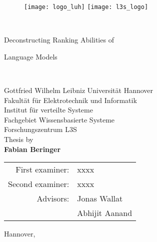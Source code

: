 \thispagestyle{empty}

{\sffamily
	\begin{figure}
		\texttt{[image: logo\_luh]}
		\hfill
		\texttt{[image: l3s\_logo]}
	\end{figure}
	\begin{center}
		\mbox{} \\
		\vspace{1.5cm}
		\huge{Deconstructing Ranking Abilities of

			Language Models}\\
		\vspace{1.8cm}
		{\large
			Gottfried Wilhelm Leibniz Universität Hannover\\
			Fakultät für Elektrotechnik und Informatik\\
			Institut für verteilte Systeme \\
			Fachgebiet Wissensbasierte Systeme \\
			Forschungszentrum L3S \\
			\vspace{1.8cm}
			Thesis by \\
			\textbf{Fabian Beringer} \\
			\vspace{1.8cm}
			\begin{tabular}{rl}
				First examiner:  & xxxx           \\
				Second examiner: & xxxx           \\
				Advisors:        & Jonas Wallat   \\
				                 & Abhijit Aanand
			\end{tabular}
			\vfill
			Hannover, \handindate
		}
	\end{center}
}
\newpage